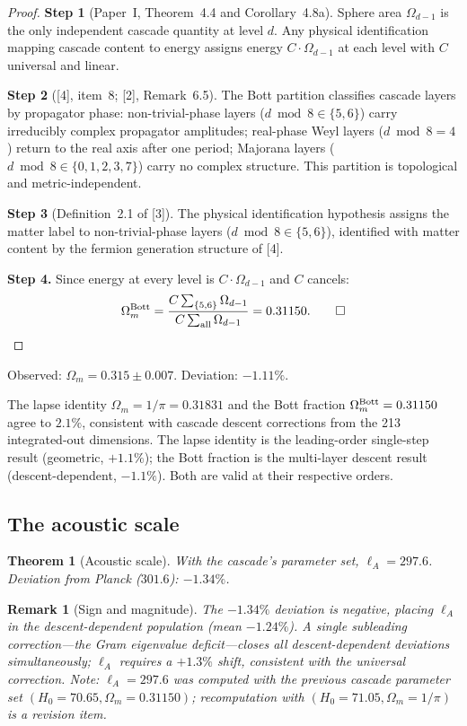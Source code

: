 \documentclass[12pt,a4paper]{article}
\newtheorem{theorem}{Theorem}[section]
\newtheorem*{remark}{Remark}
\begin{document}
\begin{proof}
\textbf{Step 1} (Paper~I, Theorem~4.4 and Corollary~4.8a). Sphere area $\Omega_{d-1}$ is the only
independent cascade quantity at level $d$. Any physical identification mapping cascade
content to energy assigns energy $C \cdot \Omega_{d-1}$ at each level with $C$ universal and linear.

\textbf{Step 2} ([4], item~8; [2], Remark~6.5). The Bott partition classifies cascade layers
by propagator phase: non-trivial-phase layers ($d \bmod 8 \in \{5, 6\}$) carry irreducibly
complex propagator amplitudes; real-phase Weyl layers ($d \bmod 8 = 4$) return to the real
axis after one period; Majorana layers ($d \bmod 8 \in \{0,1,2,3,7\}$) carry no complex
structure. This partition is topological and metric-independent.

\textbf{Step 3} (Definition~2.1 of [3]). The physical identification hypothesis assigns the
matter label to non-trivial-phase layers ($d \bmod 8 \in \{5, 6\}$), identified with matter
content by the fermion generation structure of [4].

\textbf{Step 4.} Since energy at every level is $C \cdot \Omega_{d-1}$ and $C$ cancels:
\[
\Omega_m^{\rm Bott} = \frac{C\sum_{\{5,6\}}\Omega_{d-1}}{C\sum_{\rm all}\Omega_{d-1}} = 0.31150.\qquad\square
\]
\end{proof}

Observed: $\Omega_m = 0.315 \pm 0.007$. Deviation: $-1.11\%$.

The lapse identity $\Omega_m = 1/\pi = 0.31831$ and the Bott fraction
$\Omega_m^{\rm Bott} = 0.31150$ agree to $2.1\%$, consistent with cascade descent corrections
from the 213 integrated-out dimensions. The lapse identity is the leading-order
single-step result (geometric, $+1.1\%$); the Bott fraction is the multi-layer descent
result (descent-dependent, $-1.1\%$). Both are valid at their respective orders.

\subsection{The acoustic scale}

\begin{theorem}[Acoustic scale]
With the cascade's parameter set, $\ell_A = 297.6$. Deviation from Planck ($301.6$): $-1.34\%$.
\end{theorem}

\begin{remark}[Sign and magnitude]
The $-1.34\%$ deviation is negative, placing $\ell_A$ in the descent-dependent population
(mean $-1.24\%$). A single subleading correction---the Gram eigenvalue deficit---closes
all descent-dependent deviations simultaneously; $\ell_A$ requires a $+1.3\%$ shift,
consistent with the universal correction.
Note: $\ell_A = 297.6$ was computed with the previous cascade parameter set
$(H_0 = 70.65, \Omega_m = 0.31150)$; recomputation with $(H_0 = 71.05, \Omega_m = 1/\pi)$
is a revision item.
\end{remark}
\end{document}
